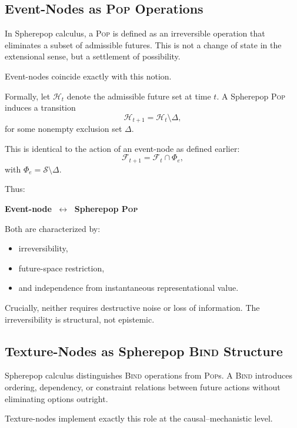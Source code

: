 \documentclass[11pt]{article}
\newcommand{\State}{\mathcal{S}}
\newcommand{\Future}{\mathcal{F}}
\begin{document}
\subsection{Event-Nodes as \textsc{Pop} Operations}

In Spherepop calculus, a \textsc{Pop} is defined as an irreversible operation
that eliminates a subset of admissible futures. This is not a change of state
in the extensional sense, but a settlement of possibility.

Event-nodes coincide exactly with this notion.

Formally, let $\mathcal{H}_t$ denote the admissible future set at time $t$. A
Spherepop \textsc{Pop} induces a transition
\begin{equation}
\mathcal{H}_{t+1} = \mathcal{H}_t \setminus \Delta,
\end{equation}
for some nonempty exclusion set $\Delta$.

This is identical to the action of an event-node as defined earlier:
\begin{equation}
\Future_{t+1} = \Future_t \cap \Phi_e,
\end{equation}
with $\Phi_e = \State \setminus \Delta$.

Thus:
\begin{center}
\textbf{Event-node} $\;\longleftrightarrow\;$ \textbf{Spherepop \textsc{Pop}}
\end{center}

Both are characterized by:
\begin{itemize}
\item irreversibility,
\item future-space restriction,
\item and independence from instantaneous representational value.
\end{itemize}

Crucially, neither requires destructive noise or loss of information. The
irreversibility is structural, not epistemic.

\subsection{Texture-Nodes as Spherepop \textsc{Bind} Structure}

Spherepop calculus distinguishes \textsc{Bind} operations from \textsc{Pop}s.
A \textsc{Bind} introduces ordering, dependency, or constraint relations
between future actions without eliminating options outright.

Texture-nodes implement exactly this role at the causal–mechanistic level.
\end{document}
